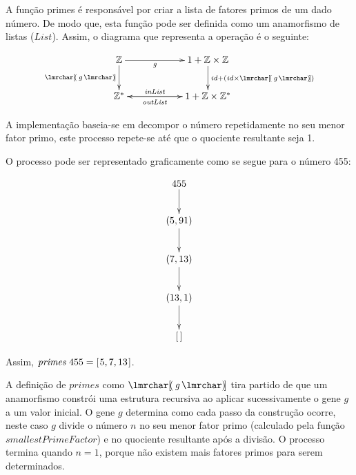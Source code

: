 \documentclass[11pt, a4paper, fleqn]{article}
\newcommand{\Conid}[1]{\mathit{#1}}
\newcommand{\Varid}[1]{\mathit{#1}}
\begin{document}
A função primes é responsável por criar a lista de fatores primos de um dado número. De modo que, esta função pode ser definida
como um anamorfismo de listas (\ensuremath{\Conid{List}}). Assim, o diagrama que representa a operação é o seguinte:

\begin{eqnarray*}
\xymatrix@C=2cm{
    \ensuremath{\mathbb{Z}}
           \ar[d]_-{\ensuremath{\anaList{\Varid{g}}}}
            \ar[r]_-{\ensuremath{\Varid{g}}} 
&
    \ensuremath{\mathrm{1}\mathbin{+}\mathbb{Z}} \times \ensuremath{\mathbb{Z}}
           \ar[d]^{\ensuremath{\Varid{id}\mathbin{+}(\Varid{id}} \times \ensuremath{\anaList{\Varid{g}}})}
\\
     \ensuremath{\mathbb{Z}}^*
            \ar[r]_-{\ensuremath{\Varid{outList}}} 
&
     \ensuremath{\mathrm{1}\mathbin{+}\mathbb{Z}} \times \ensuremath{\mathbb{Z}}^*
           \ar[l]_-{\ensuremath{\Varid{inList}}}
}
\end{eqnarray*}

A implementação baseia-se em decompor o número repetidamente no seu menor fator primo, este processo repete-se até que o quociente resultante seja 1.

O processo pode ser representado graficamente como se segue para o número 455:

\begin{eqnarray*}
\xymatrix@C=2cm{
    \ensuremath{\mathrm{455}}
        \ar[d]
\\
    \ensuremath{(\mathrm{5},\mathrm{91})}
        \ar[d]
\\
    \ensuremath{(\mathrm{7},\mathrm{13})}
        \ar[d]
\\
    \ensuremath{(\mathrm{13},\mathrm{1})}
        \ar[d]
\\
    \ensuremath{[\mskip1.5mu \mskip1.5mu]}
}
\end{eqnarray*}

Assim, \ensuremath{\Varid{primes}\;\mathrm{455}\mathrel{=}[\mskip1.5mu \mathrm{5},\mathrm{7},\mathrm{13}\mskip1.5mu]}.

A definição de \ensuremath{\Varid{primes}} como \ensuremath{\anaList{\Varid{g}}} tira partido de que um anamorfismo constrói uma estrutura recursiva ao aplicar sucessivamente o gene \ensuremath{\Varid{g}} a um valor inicial.
O gene \ensuremath{\Varid{g}} determina como cada passo da construção ocorre, neste caso \ensuremath{\Varid{g}} divide o número \ensuremath{\Varid{n}} no seu menor fator primo (calculado pela função \ensuremath{\Varid{smallestPrimeFactor}}) e no quociente resultante após a divisão.
O processo termina quando \ensuremath{\Varid{n}\mathrel{=}\mathrm{1}}, porque não existem mais fatores primos para serem determinados.
\end{document}
